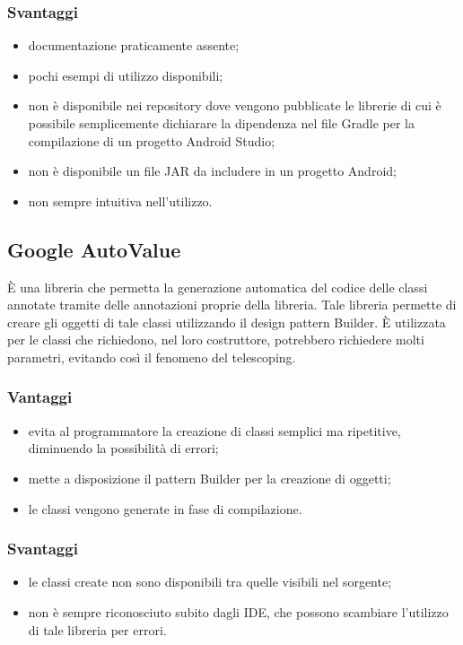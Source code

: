 \documentclass[../Tesi.tex]{subfiles}
\begin{document}
		\subsubsection{Svantaggi}
			\begin{itemize}
				\item documentazione praticamente assente;
				\item pochi esempi di utilizzo disponibili;
				\item non è disponibile nei repository dove vengono pubblicate le librerie di cui è possibile semplicemente dichiarare la dipendenza nel file Gradle per la compilazione di un progetto Android Studio;
				\item non è disponibile un file JAR da includere in un progetto Android;
				\item non sempre intuitiva nell'utilizzo.
			\end{itemize}

	\subsection{Google AutoValue}
		È una libreria che permetta la generazione automatica del codice delle classi annotate tramite delle annotazioni proprie della libreria. Tale libreria permette di creare gli oggetti di tale classi utilizzando il design pattern Builder. È utilizzata per le classi che richiedono, nel loro costruttore, potrebbero richiedere molti parametri, evitando così il fenomeno del telescoping. 
		\subsubsection{Vantaggi}
			\begin{itemize}	
				\item evita al programmatore la creazione di classi semplici ma ripetitive, diminuendo la possibilità di errori;
				\item mette a disposizione il pattern Builder per la creazione di oggetti;
				\item le classi vengono generate in fase di compilazione.
			\end{itemize}
		\subsubsection{Svantaggi}
			\begin{itemize}
				\item le classi create non sono disponibili tra quelle visibili nel sorgente;
				\item non è sempre riconosciuto subito dagli IDE, che possono scambiare l'utilizzo di tale libreria per errori.
			\end{itemize}
\end{document}
